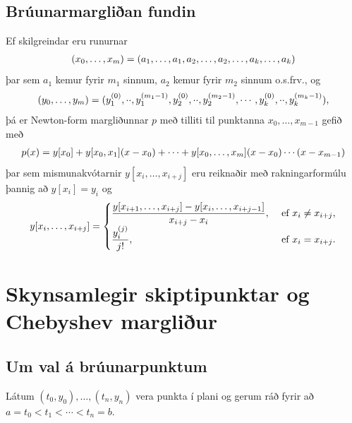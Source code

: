 \documentclass[letterpaper,10pt,icelandic]{sphinxmanual}
\begin{document}
\subsection{Brúunarmargliðan fundin}
\label{kafli03:bruunarmarglian-fundin}
Ef skilgreindar eru runurnar
\begin{gather}
\begin{split}(x_0,\dots,x_m)=(a_1,\dots,a_1,a_2,\dots,a_2,\dots,a_k,\dots,a_k)\end{split}\notag
\end{gather}
þar sem \(a_1\) kemur fyrir \(m_1\) sinnum, \(a_2\) kemur
fyrir \(m_2\) sinnum o.s.frv., og
\begin{gather}
\begin{split}(y_0,\dots,y_m)=(y_1^{(0)},\cdot\cdot,y_1^{(m_1-1)},y_2^{(0)},\cdot\cdot,y_2^{(m_2-1)},
\cdots,y_k^{(0)},\cdot\cdot,y_k^{(m_k-1)}),\end{split}\notag
\end{gather}
þá er Newton-form margliðunnar \(p\) með tilliti til punktanna
\(x_0,\dots,x_{m-1}\) gefið með
\begin{gather}
\begin{split}p(x)=y[x_0]+y[x_0,x_1](x-x_0)+\cdots+y[x_0,\dots,x_m](x-x_0)\cdots(x-x_{m-1})\end{split}\notag
\end{gather}
þar sem mismunakvótarnir \(y[x_i,\ldots,x_{i+j}]\) eru reiknaðir með
rakningarformúlu þannig að \(y[x_i]=y_i\) og
\begin{gather}
\begin{split}y[x_i,\ldots,x_{i+j}]
  = \begin{cases}\dfrac{y[x_{i+1},\ldots,x_{i+j}] - y[x_i,\ldots,x_{i+j-1}]}
  {x_{i+j} - x_i}, &\text{ ef } x_i\neq x_{i+j},\\
\dfrac{y^{(j)}_i}{j!}, &\text{ ef } x_i=x_{i+j}.
\end{cases}\end{split}\notag
\end{gather}

\section{Skynsamlegir skiptipunktar og Chebyshev margliður}
\label{kafli03:skynsamlegir-skiptipunktar-og-chebyshev-margliur}

\subsection{Um val á brúunarpunktum}
\label{kafli03:um-val-a-bruunarpunktum}
Látum \((t_0,y_0),\dots,(t_n,y_n)\) vera punkta í plani og gerum ráð
fyrir að \(a=t_0<t_1<\cdots<t_n=b\).
\end{document}
